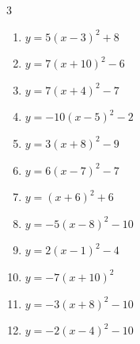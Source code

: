 \begin{multicols}{3}
\begin{enumerate}
  \item $\displaystyle y=5\left( x-3\right)^{2}+8$

        \phantom{$\displaystyle 頂点\left( 3 , 8 \right)$}

  \item $\displaystyle y=7\left( x+10\right)^{2}-6$

        \phantom{$\displaystyle 頂点\left( -10 , -6 \right)$}

  \item $\displaystyle y=7\left( x+4\right)^{2}-7$

        \phantom{$\displaystyle 頂点\left( -4 , -7 \right)$}

  \item $\displaystyle y=-10\left( x-5\right)^{2}-2$

        \phantom{$\displaystyle 頂点\left( 5 , -2 \right)$}

  \item $\displaystyle y=3\left( x+8\right)^{2}-9$

        \phantom{$\displaystyle 頂点\left( -8 , -9 \right)$}

  \item $\displaystyle y=6\left( x-7\right)^{2}-7$

        \phantom{$\displaystyle 頂点\left( 7 , -7 \right)$}

  \item $\displaystyle y=\left( x+6\right)^{2}+6$

        \phantom{$\displaystyle 頂点\left( -6 , 6 \right)$}

  \item $\displaystyle y=-5\left( x-8\right)^{2}-10$

        \phantom{$\displaystyle 頂点\left( 8 , -10 \right)$}

  \item $\displaystyle y=2\left( x-1\right)^{2}-4$

        \phantom{$\displaystyle 頂点\left( 1 , -4 \right)$}

  \item $\displaystyle y=-7\left( x+10\right)^{2}$

        \phantom{$\displaystyle 頂点\left( -10 , 0 \right)$}

  \item $\displaystyle y=-3\left( x+8\right)^{2}-10$

        \phantom{$\displaystyle 頂点\left( -8 , -10 \right)$}

  \item $\displaystyle y=-2\left( x-4\right)^{2}-10$


\end{enumerate}
\end{multicols}
